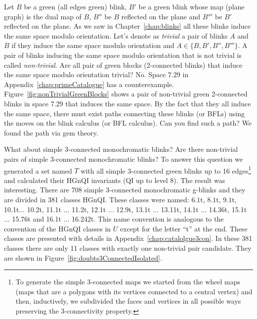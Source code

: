 Let $B$ be a green (all edges green) blink, $B'$ be a green blink
whose map (plane graph) is the dual map of $B$, $B''$ be $B$
reflected on the plane and $B'''$ be $B'$ reflected on the plane.
As we saw in Chapter~\ref{chap:blinks} all these blinks induce the
same space modulo orientation. Let's denote as {\em trivial}
a pair of blinks $A$ and $B$ if they induce the same space modulo
orientation and $A \in \{B,B',B'',B'''\}$. A pair of blinks inducing
the same space modulo orientation that is not trivial is called
{\em non-trivial}. Are all pair of green blocks (2-connected blinks)
that induce the same space modulo orientation trivial?
No. Space $7.29$ in Appendix~\ref{chap:primeCatalogue}
has a counterexample. Figure~\ref{fig:nonTrivialGreenBlocks} shows
a pair of non-trivial green 2-connected blinks in space 7.29 that induces
the same space. By the fact that they  all induce the same space, there must exist
paths connecting these blinks (or BFLs) using the moves
on the blink calculus (or BFL
calculus). Can you find such a path? We found the path via gem theory.

What about simple 3-connected monochromatic blinks?  Are there
non-trivial pairs of simple 3-connected monochromatic blinks?
To answer this question we generated a set named $T$ with all simple
3-connected green blinks up to 16 edges\footnote{To generate the simple
3-connected maps we started from the wheel maps (maps that are a polygons
with its vertices connected to a central vertex) and then, inductively, we
subdivided the faces and vertices in all possible ways preserving the
3-connectivity property.}
and calculated their HGnQI invariants (QI up to level 8).
The result was interesting. There are
708 simple 3-connected monochromatic g-blinks and they are divided in 381
classes HGnQI. These classes were named: $6.1$t, $8.1$t, $9.1$t,
10.1t$\ldots$ 10.2t, 11.1t $\ldots$ 11.2t, 12.1t $\ldots$ 12.9t,
13.1t $\ldots$ 13.11t, 14.1t $\ldots$ 14.36t, 15.1t $\ldots$ 15.76t
and 16.1t $\ldots$ 16.242t. This name convention is analogous to
the convention of the HGnQI classes in $U$ except for the
letter ``t'' at the end. These classes are presented with details in
Appendix~\ref{chap:catalolgue3con}. In these 381 classes there are
only 11 classes with exactly one non-trivial pair candidate. They
are shown in Figure~\ref{fig:doubts3ConnectedIsolated}.

\enlargethispage{2cm}

